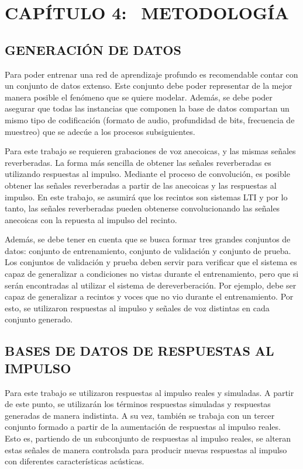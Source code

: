 \section[Metodología]{CAPÍTULO 4:$\ \ \ \ $METODOLOGÍA} 

\subsection[Análisis de datos]{GENERACIÓN DE DATOS}
Para poder entrenar una red de aprendizaje profundo es recomendable contar con un conjunto de datos extenso. Este conjunto debe poder representar de la mejor manera posible el fenómeno que se quiere modelar. Además, se debe poder asegurar que todas las instancias que componen la base de datos compartan un mismo tipo de codificación (formato de audio, profundidad de bits, frecuencia de muestreo) que se adecúe a los procesos subsiguientes. 

Para este trabajo se requieren grabaciones de voz anecoicas, y las mismas señales reverberadas. La forma más sencilla de obtener las señales reverberadas es utilizando respuestas al impulso. Mediante el proceso de convolución, es posible obtener las señales reverberadas a partir de las anecoicas y las respuestas al impulso. En este trabajo, se asumirá que los recintos son sistemas LTI y por lo tanto, las señales reverberadas pueden obtenerse convolucionando las señales anecoicas con la repuesta al impulso del recinto.

Además, se debe tener en cuenta que se busca formar tres grandes conjuntos de datos: conjunto de entrenamiento, conjunto de validación y conjunto de prueba. Los conjuntos de validación y prueba deben servir para verificar que el sistema es capaz de generalizar a condiciones no vistas durante el entrenamiento, pero que si serán encontradas al utilizar el sistema de dereverberación. Por ejemplo, debe ser capaz de generalizar a recintos y voces que no vio durante el entrenamiento. Por esto, se utilizaron respuestas al impulso y señales de voz distintas en cada conjunto generado.   


\subsection[Base de datos de respuestas al impulso]{BASES DE DATOS DE RESPUESTAS AL IMPULSO}

Para este trabajo se utilizaron respuestas al impulso reales y simuladas. A partir de este punto, se utilizarán los términos respuestas simuladas y respuestas generadas de manera indistinta. A su vez, también se trabaja con un tercer conjunto formado a partir de la aumentación de respuestas al impulso reales. Esto es, partiendo de un subconjunto de respuestas al impulso reales, se alteran estas señales de manera controlada para producir nuevas respuestas al impulso con diferentes características acústicas.

